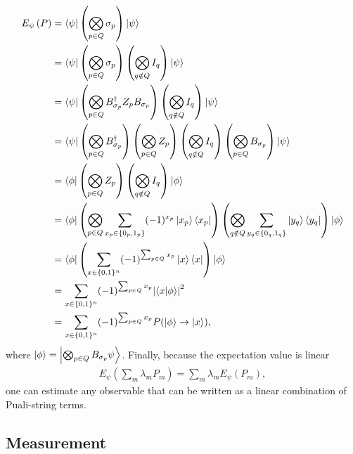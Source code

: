 \documentclass[10pt]{article}
\begin{document}
\begin{align}
E_{\psi}\left(P\right)
&=\bra{\psi}\left(\bigotimes_{p\in Q}\sigma_p\right)\ket{\psi} \nonumber \\
&=\bra{\psi}\left(\bigotimes_{p\in Q}\sigma_p\right)
\left(\bigotimes_{q\notin Q}I_q\right)\ket{\psi} \nonumber \\
&=\bra{\psi}\left(\bigotimes_{p \in Q}B_{\sigma_p}^{\dagger}Z_pB_{\sigma_p}\right)
\left(\bigotimes_{q\notin Q}I_q\right)\ket{\psi} \nonumber \\
&=
\bra{\psi}\left(\bigotimes_{p \in Q}B_{\sigma_p}^{\dagger}\right)
\left(\bigotimes_{p \in Q}Z_p\right)
\left(\bigotimes_{q\notin Q}I_q\right)
\left(\bigotimes_{p \in Q}B_{\sigma_p}\right)\ket{\psi} \nonumber 
\\
&=
\bra{\phi}
\left(\bigotimes_{p \in Q}Z_p\right)
\left(\bigotimes_{q\notin Q}I_q\right)
\ket{\phi} \nonumber \\
&=
\bra{\phi}
\left(\bigotimes_{p\in Q}\sum_{x_p\in\{0_p,1_p\}}(-1)^{x_p}\ket{x_p}\bra{x_p}\right)
\left(\bigotimes_{q\notin Q}\sum_{y_q\in\{0_q,1_q\}}\ket{y_q}\bra{y_q}\right)
\ket{\phi} 
\nonumber 
\\
&=
\bra{\phi}
\left(\sum_{x\in\{0,1\}^n}(-1)^{\sum_{p\in Q}x_p}\ket{x}\bra{x}\right)
\ket{\phi} 
\nonumber 
\\
&=
\sum_{x\in\{0,1\}^n}(-1)^{\sum_{p\in Q}x_p}\abs{\bra{x}\ket{\phi}}^2
\nonumber 
\\
&=
\sum_{x\in\{0,1\}^n}(-1)^{\sum_{p\in Q}x_p}P(\ket{\phi}\to\ket{x})
,\end{align}
where $\ket{\phi}=\ket{\bigotimes_{p\in Q}B_{\sigma_p}\psi}$. Finally, because the expectation value is linear
\begin{align}
E_\psi\left(\sum_{m}\lambda_mP_m\right) = \sum_m\lambda_mE_\psi(P_m)
,\end{align}
one can estimate any observable that can be written as a linear combination of Puali-string terms. 

\subsection{Measurement}
\end{document}
